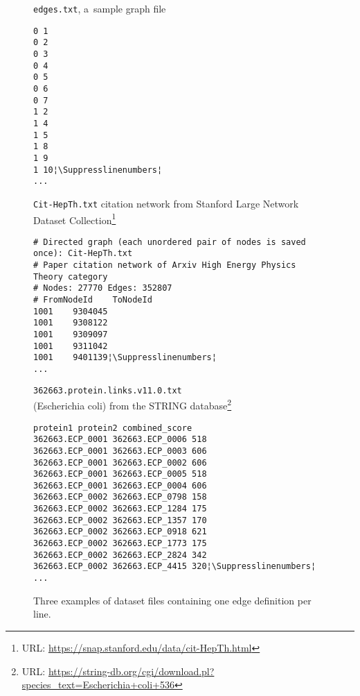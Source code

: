 \begin{savenotes}
\begin{figure}[!ht]
\caption{Three examples of dataset files containing one edge definition per line.}\label{fig:edge_file_examples}
\begin{minipage}[t]{.12\textwidth}
\raggedright\footnotesize \texttt{edges.txt}, a~sample graph file
\begin{lstlisting}
0 1
0 2
0 3
0 4
0 5
0 6
0 7
1 2
1 4
1 5
1 8
1 9
1 10¦\Suppresslinenumbers¦
...
\end{lstlisting}\Reactivatelinenumbers
\end{minipage}\hspace*{0.8cm}%
\begin{minipage}[t]{.36\textwidth}
\footnotesize \texttt{Cit-HepTh.txt} citation network from Stan\-ford Large Network Data\-set Col\-lec\-tion\footnote{URL: \url{https://snap.stanford.edu/data/cit-HepTh.html}}
\begin{lstlisting}
# Directed graph (each unordered pair of nodes is saved once): Cit-HepTh.txt
# Paper citation network of Arxiv High Energy Physics Theory category
# Nodes: 27770 Edges: 352807
# FromNodeId	ToNodeId
1001	9304045
1001	9308122
1001	9309097
1001	9311042
1001	9401139¦\Suppresslinenumbers¦
...
\end{lstlisting}\Reactivatelinenumbers
\end{minipage}\hspace*{0.8cm}%
\begin{minipage}[t]{0.41\textwidth}
\footnotesize \texttt{362663.protein.links.v11.0.txt} \\(Escherichia coli) from the STRING data\-base\footnote{URL: \url{https://string-db.org/cgi/download.pl?species_text=Escherichia+coli+536}}
\begin{lstlisting}
protein1 protein2 combined_score
362663.ECP_0001 362663.ECP_0006 518
362663.ECP_0001 362663.ECP_0003 606
362663.ECP_0001 362663.ECP_0002 606
362663.ECP_0001 362663.ECP_0005 518
362663.ECP_0001 362663.ECP_0004 606
362663.ECP_0002 362663.ECP_0798 158
362663.ECP_0002 362663.ECP_1284 175
362663.ECP_0002 362663.ECP_1357 170
362663.ECP_0002 362663.ECP_0918 621
362663.ECP_0002 362663.ECP_1773 175
362663.ECP_0002 362663.ECP_2824 342
362663.ECP_0002 362663.ECP_4415 320¦\Suppresslinenumbers¦
...
\end{lstlisting}\Reactivatelinenumbers
\end{minipage}%
\hspace*{-0.5cm}
\end{figure}
\end{savenotes}

